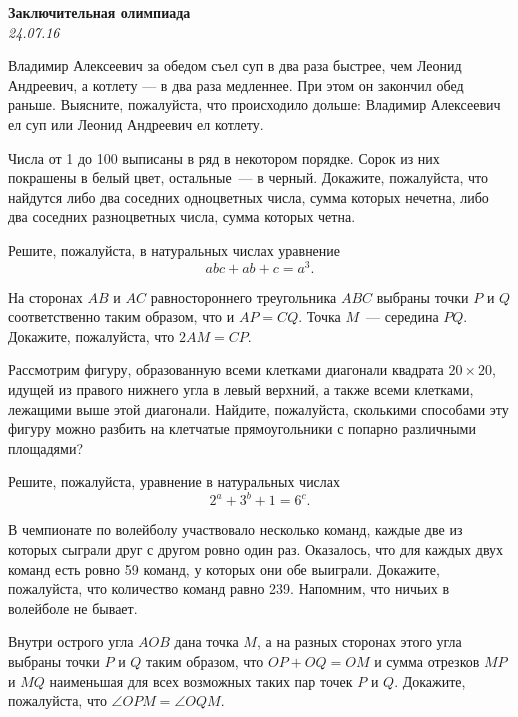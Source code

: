 \begin{center}
\textbf{\Large Заключительная олимпиада}\\
\textit{24.07.16}
\end{center}


\begin{problems}

\item Владимир Алексеевич за обедом съел суп в два раза быстрее, чем Леонид Андреевич, а котлету --- в два раза медленнее. При этом он закончил обед раньше. Выясните, пожалуйста, что происходило дольше: Владимир Алексеевич ел суп или Леонид Андреевич ел котлету.

\item Числа от 1 до 100 выписаны в ряд в некотором порядке. Сорок
из них покрашены в белый цвет, остальные~--- в черный. 
Докажите, пожалуйста, что найдутся либо два соседних одноцветных числа, сумма
которых нечетна, либо два соседних разноцветных числа, сумма
которых четна.

\item Решите, пожалуйста, в натуральных числах уравнение
$$
abc+ab+c=a^3.
$$

\item На сторонах $AB$ и $AC$  равностороннего треугольника $ABC$  выбраны точки $P$ и $Q$  соответственно 
таким образом, что и $AP = CQ$. Точка $M$~---  середина $PQ$. Докажите, пожалуйста, что $2AM=CP$.  

\item Рассмотрим фигуру, образованную всеми клетками диагонали квадрата
$20\times 20$, идущей из правого нижнего угла в левый верхний, а
также всеми клетками, лежащими выше этой диагонали. 
Найдите, пожалуйста, сколькими
способами эту фигуру можно разбить на клетчатые прямоугольники с
попарно различными площадями?

\item Решите, пожалуйста, уравнение в натуральных числах
$$
2^a+3^b+1=6^c.
$$

\item В чемпионате по волейболу участвовало несколько команд, каждые две из которых сыграли друг с другом ровно один раз. Оказалось, что для каждых двух команд есть ровно 59 команд, у которых они обе выиграли. Докажите, пожалуйста, что количество команд равно 239.  Напомним, что ничьих в волейболе не бывает.
	
\item Внутри острого угла $AOB$ дана точка $M$, а на разных сторонах этого угла выбраны точки $P$ и
$Q$ таким образом, что $OP +OQ = OM$ и сумма отрезков $MP$ и $MQ$  наименьшая для всех возможных
таких пар точек $P$ и $Q$. Докажите, пожалуйста, что $\angle OPM = \angle OQM$.

\end{problems}
